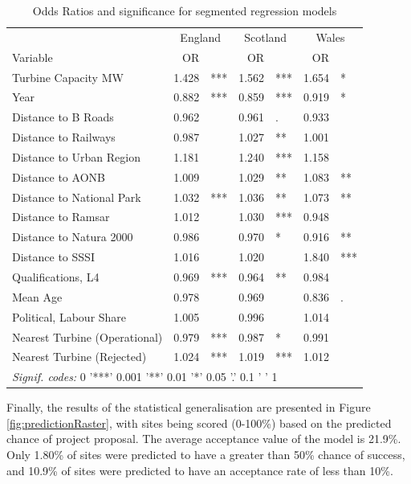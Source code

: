 \documentclass[a4paper,]{article}
\theoremstyle{definition}
\theoremstyle{definition}
\theoremstyle{definition}
\theoremstyle{remark}
\begin{document}
\begin{table}[t]

\caption{\label{tab:segmented}Odds Ratios and significance for segmented regression models}
\centering
\begin{tabular}{lrlrlrl}
\toprule
\multicolumn{1}{c}{ } & \multicolumn{2}{c}{England} & \multicolumn{2}{c}{Scotland} & \multicolumn{2}{c}{Wales} \\
\cmidrule(l{2pt}r{2pt}){2-3} \cmidrule(l{2pt}r{2pt}){4-5} \cmidrule(l{2pt}r{2pt}){6-7}
Variable & OR &  & OR &  & OR & \\
\midrule
Turbine Capacity MW & 1.428 & *** & 1.562 & *** & 1.654 & *\\
Year & 0.882 & *** & 0.859 & *** & 0.919 & *\\
Distance to B Roads & 0.962 &  & 0.961 & . & 0.933 & \\
Distance to Railways & 0.987 &  & 1.027 & ** & 1.001 & \\
Distance to  Urban Region & 1.181 &  & 1.240 & *** & 1.158 & \\
Distance to AONB & 1.009 &  & 1.029 & ** & 1.083 & **\\
Distance to National Park & 1.032 & *** & 1.036 & ** & 1.073 & **\\
Distance to Ramsar & 1.012 &  & 1.030 & *** & 0.948 & \\
Distance to Natura 2000 & 0.986 &  & 0.970 & * & 0.916 & **\\
Distance to SSSI & 1.016 &  & 1.020 &  & 1.840 & ***\\
Qualifications, L4 & 0.969 & *** & 0.964 & ** & 0.984 & \\
Mean Age & 0.978 &  & 0.969 &  & 0.836 & .\\
Political, Labour Share & 1.005 &  & 0.996 &  & 1.014 & \\
Nearest Turbine (Operational) & 0.979 & *** & 0.987 & * & 0.991 & \\
Nearest Turbine (Rejected) & 1.024 & *** & 1.019 & *** & 1.012 & \\
\bottomrule
\multicolumn{7}{l}{\textit{Signif. codes:} 0 '***' 0.001 '**' 0.01 '*' 0.05 '.' 0.1 ' ' 1}\\
\end{tabular}
\end{table}

Finally, the results of the statistical generalisation are presented in Figure \ref{fig:predictionRaster}, with sites being scored (0-100\%) based on the predicted chance of project proposal. The average acceptance value of the model is 21.9\%. Only 1.80\% of sites were predicted to have a greater than 50\% chance of success, and 10.9\% of sites were predicted to have an acceptance rate of less than 10\%.
\end{document}
